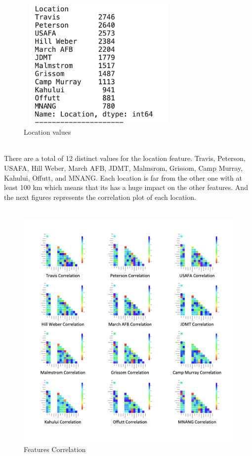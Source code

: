 \documentclass{report}
\begin{document}
\begin{figure}[h!]
  \centering
    \includegraphics[width=8cm, height=6.5cm] {count.png}
    \caption{Location values}
    \label{fig:my_label}
\end{figure} \newpage
\hfill \break 
\\
There are a total of 12 distinct values for the location feature. Travis, Peterson, USAFA, Hill Weber, March AFB, JDMT, Malmsrom, Grissom, Camp Murray, Kahului, Offutt, and MNANG. Each location is far from the other one with at least 100 km which means that its has a huge impact on the other features. And the next figures represents the correlation plot of each location.\hfill \break 
\\
\\
\begin{figure}[h!]
    \centering
    \includegraphics[width=12cm, height=12cm]{1234.png}
    \caption{Features Correlation}
\end{figure}\newpage \hfill \break 
\end{document}
